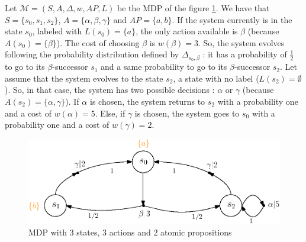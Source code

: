 \begin{example}
  Let $\mathcal{M} = (S, A, \Delta, w, AP, L)$ be the MDP of the figure \ref{simple-mdp}. We have that $S = \{s_0, s_1, s_2\}$, $A = \{\alpha, \beta, \gamma\}$ and $AP=\{a, b\}$. If the system currently is in the state $s_0$, labeled with $L(s_0) = \{a\}$, the only action available is $\beta$ (because $A(s_0) = \{\beta\}$).
  The cost of choosing $\beta$ is $w(\beta) = 3$.
  So, the system evolves following the probability distribution defined by $\Delta_{s_0, \beta}$ : it has a probability of $\frac{1}{2}$
  to go to its $\beta$-successor $s_1$ and a same probability to go to its $\beta$-successor $s_2$. Let assume that the system evolves to the state $s_2$, a state with no label ($L(s_2) = \emptyset$). So, in that case, the system has two possible decisions : $\alpha$ or $\gamma$ (because $A(s_2) = \{\alpha, \gamma\}$). If $\alpha$ is chosen, the system returns to $s_2$ with a probability one and a cost of $w(\alpha) = 5$. Else, if $\gamma$ is chosen, the system goes to $s_0$ with a probability one and a cost of $w(\gamma) = 2$.
  \begin{figure}[h!]
    \centering
    \includegraphics[width=0.7\linewidth]{resources/simple-mdp}
    \caption{MDP with $3$ states, $3$ actions and $2$ atomic propositions}\label{simple-mdp}
  \end{figure}
\end{example}


